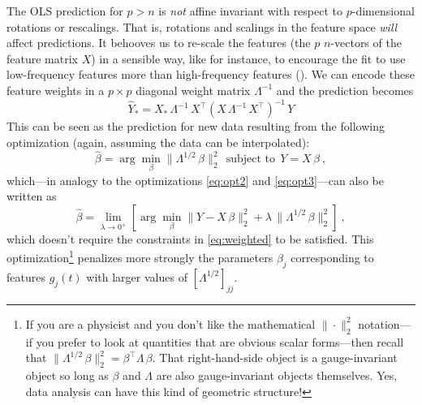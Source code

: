 \documentclass[12pt,letterpaper]{article}
\begin{document}
The OLS prediction for $p>n$ is \emph{not} affine invariant with respect to $p$-dimensional rotations or rescalings.
That is, rotations and scalings in the feature space \emph{will} affect predictions.
It behooves us to re-scale the features (the $p$ $n$-vectors of the feature matrix $X$) in a sensible way, like for instance, to encourage the fit to use low-frequency features more than high-frequency features (\citealt{xie2020weighted, bah2016sample, rauhut2016interpolation}).
We can encode these feature weights in a $p\times p$ diagonal weight matrix $\Lambda^{-1}$ and the prediction becomes
\begin{equation} \label{eq:weighted_sol}
    \hat{Y}_\ast = X_\ast\,\Lambda^{-1}\,X^\top (X\,\Lambda^{-1}\,X^\top)^{-1}\,Y
\end{equation}
This can be seen as the prediction for new data resulting from the following optimization (again, assuming the data can be interpolated):
\begin{equation} \label{eq:weighted}
    \hat{\beta} = \arg\min_\beta \|\Lambda^{1/2}\,\beta\|_2^2 ~~\mbox{subject to}~~ Y = X\,\beta
    ~,
\end{equation}
which---in analogy to the optimizations \eqref{eq:opt2} and \eqref{eq:opt3}---can also be written as
\begin{equation}
    \hat{\beta} = \lim_{\lambda\rightarrow 0^+}\left[\arg\min_\beta \|Y - X\,\beta\|_2^2 + \lambda\,\|\Lambda^{1/2}\,\beta\|_2^2\right]
    ~,
\end{equation}
which doesn't require the constraints in \eqref{eq:weighted} to be satisfied. 
This optimization\footnote{If you are a physicist and you don't like the mathematical $\|\cdot\|_2^2$ notation---if you prefer to look at quantities that are obvious scalar forms---then recall that $\|\Lambda^{1/2}\,\beta\|_2^2 = \beta^\top\Lambda\,\beta$.
That right-hand-side object is a gauge-invariant object so long as $\beta$ and $\Lambda$ are also gauge-invariant objects themselves.
Yes, data analysis can have this kind of geometric structure!}
penalizes more strongly the parameters $\beta_j$ corresponding to features $g_j(t)$ with larger values of $[\Lambda^{1/2}]_{jj}$.
\end{document}

